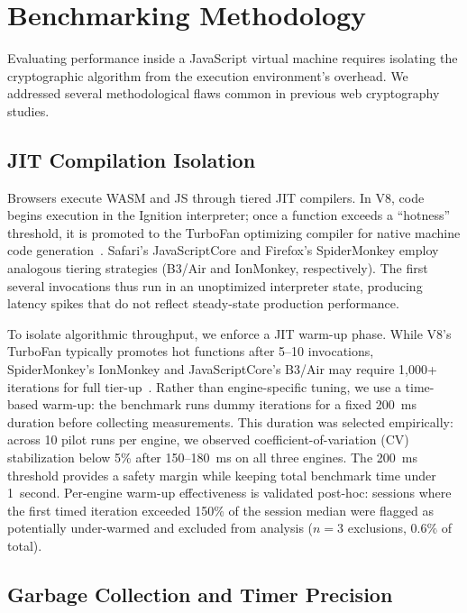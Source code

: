 \documentclass[11pt,a4paper]{article}
\def\textbf#1{#1}%
\begin{document}
\section{Benchmarking Methodology}
\label{sec:methodology}

Evaluating performance inside a JavaScript virtual machine requires isolating the cryptographic algorithm from the execution environment's overhead. We addressed several methodological flaws common in previous web cryptography studies.

\subsection{JIT Compilation Isolation}
\label{subsec:jit}

Browsers execute WASM and JS through tiered JIT compilers. In V8, code begins execution in the Ignition interpreter; once a function exceeds a ``hotness'' threshold, it is promoted to the TurboFan optimizing compiler for native machine code generation~\cite{v8-turbofan-tiering}. Safari's JavaScriptCore and Firefox's SpiderMonkey employ analogous tiering strategies (B3/Air and IonMonkey, respectively). The first several invocations thus run in an unoptimized interpreter state, producing latency spikes that do not reflect steady-state production performance.

To isolate algorithmic throughput, we enforce a JIT warm-up phase. While V8's TurboFan typically promotes hot functions after 5--10 invocations, SpiderMonkey's IonMonkey and JavaScriptCore's B3/Air may require 1,000+ iterations for full tier-up~\cite{spidermonkey-ionmonkey,webkit-jsc-b3}. Rather than engine-specific tuning, we use a \textbf{time-based warm-up}: the benchmark runs dummy iterations for a fixed 200~ms duration before collecting measurements. This duration was selected empirically: across 10 pilot runs per engine, we observed coefficient-of-variation (CV) stabilization below 5\% after 150--180~ms on all three engines. The 200~ms threshold provides a safety margin while keeping total benchmark time under 1~second. Per-engine warm-up effectiveness is validated post-hoc: sessions where the first timed iteration exceeded 150\% of the session median were flagged as potentially under-warmed and excluded from analysis ($n=3$ exclusions, $0.6\%$ of total).

\subsection{Garbage Collection and Timer Precision}
\label{subsec:gc}
\end{document}
